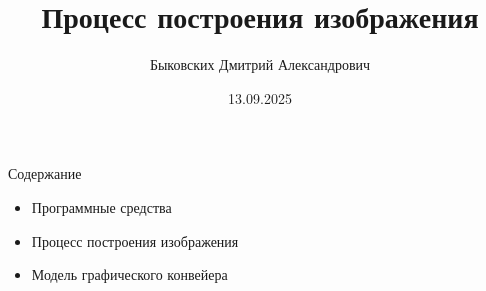 \documentclass{beamer}
\title[Построение изображений]{Процесс построения изображения}
\author[Быковских Д.А.]{Быковских Дмитрий Александрович}
\date{13.09.2025}
\begin{document}
\begin{frame}
	\titlepage
\end{frame}

\begin{frame}{Содержание}
	\begin{itemize}
		\item
		      Программные средства
		\item
		      Процесс построения изображения
		\item
		      Модель графического конвейера
	\end{itemize}
\end{frame}
\end{document}
